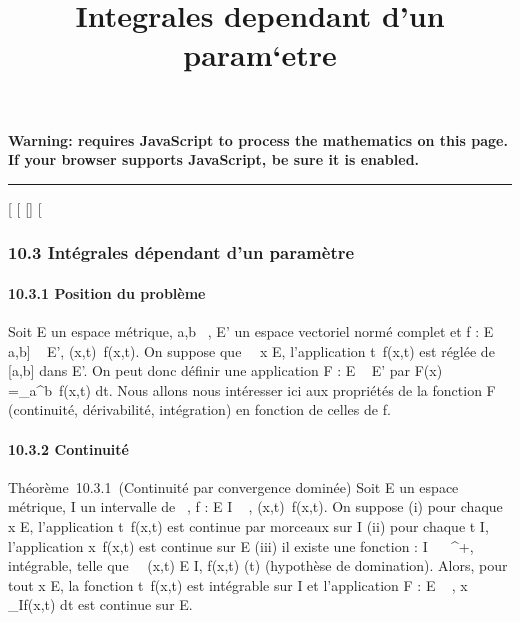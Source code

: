 \documentclass[]{article}
\title{Integrales dependant d'un param`etre}
\author{}
\date{}
\begin{document}
\maketitle

\textbf{Warning: 
requires JavaScript to process the mathematics on this page.\\ If your
browser supports JavaScript, be sure it is enabled.}

\begin{center}\rule{3in}{0.4pt}\end{center}

{[}
{[}
{[}{]}
{[}

\subsubsection{10.3 Intégrales dépendant d'un paramètre}

\paragraph{10.3.1 Position du problème}

Soit E un espace métrique, a,b \in {}~, E' un espace vectoriel normé complet
et f : E \times {[}a,b{]} \rightarrow~ E', (x,t)\mapsto~f(x,t). On
suppose que \forall~~x \in E, l'application
t\mapsto~f(x,t) est réglée de {[}a,b{]} dans E'. On
peut donc définir une application F : E \rightarrow~ E' par F(x)
=\int  \_a^b~f(x,t) dt. Nous allons
nous intéresser ici aux propriétés de la fonction F (continuité,
dérivabilité, intégration) en fonction de celles de f.

\paragraph{10.3.2 Continuité}

Théorème~10.3.1~(Continuité par convergence dominée) Soit E un espace
métrique, I un intervalle de ~, f : E \times I \rightarrow~ ,
(x,t)\mapsto~f(x,t). On suppose (i) pour chaque x \in
E, l'application t\mapsto~f(x,t) est continue par
morceaux sur I (ii) pour chaque t \in I, l'application
x\mapsto~f(x,t) est continue sur E (iii) il existe
une fonction \phi : I \rightarrow~ ~^+, intégrable, telle que
\forall~~(x,t) \in E \times I, \textbar{}f(x,t)\textbar{}\leq
\phi(t) (hypothèse de domination). Alors, pour tout x \in E, la fonction
t\mapsto~f(x,t) est intégrable sur I et
l'application F : E \rightarrow~ ,
x\mapsto~\int ~
\_If(x,t) dt est continue sur E.
\end{document}
